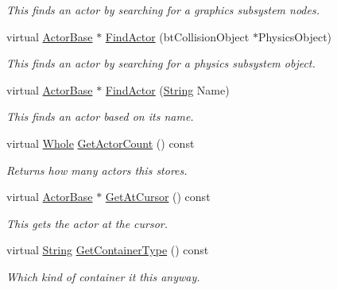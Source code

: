 \begin{DoxyCompactItemize}
\begin{DoxyCompactList}\small\item\em This finds an actor by searching for a graphics subsystem nodes. \item\end{DoxyCompactList}\item 
virtual \hyperlink{classMezzanine_1_1ActorBase}{ActorBase} $\ast$ \hyperlink{classMezzanine_1_1ActorContainerVector_acc1507a3a9d464ff0c343786986bef98}{FindActor} (btCollisionObject $\ast$PhysicsObject)
\begin{DoxyCompactList}\small\item\em This finds an actor by searching for a physics subsystem object. \item\end{DoxyCompactList}\item 
virtual \hyperlink{classMezzanine_1_1ActorBase}{ActorBase} $\ast$ \hyperlink{classMezzanine_1_1ActorContainerVector_a09837c17229c0a17031e7ce5fa3f6fc6}{FindActor} (\hyperlink{namespaceMezzanine_acf9fcc130e6ebf08e3d8491aebcf1c86}{String} Name)
\begin{DoxyCompactList}\small\item\em This finds an actor based on its name. \item\end{DoxyCompactList}\item 
virtual \hyperlink{namespaceMezzanine_adcbb6ce6d1eb4379d109e51171e2e493}{Whole} \hyperlink{classMezzanine_1_1ActorContainerVector_a9a4e61bb6597fb66906c779c1f27e051}{GetActorCount} () const 
\begin{DoxyCompactList}\small\item\em Returns how many actors this stores. \item\end{DoxyCompactList}\item 
virtual \hyperlink{classMezzanine_1_1ActorBase}{ActorBase} $\ast$ \hyperlink{classMezzanine_1_1ActorContainerVector_ac9efeefbc35033294723d33a8edd72c2}{GetAtCursor} () const 
\begin{DoxyCompactList}\small\item\em This gets the actor at the cursor. \item\end{DoxyCompactList}\item 
virtual \hyperlink{namespaceMezzanine_acf9fcc130e6ebf08e3d8491aebcf1c86}{String} \hyperlink{classMezzanine_1_1ActorContainerVector_a22c7e6456504a7a7f93825936d2d2b8f}{GetContainerType} () const 
\begin{DoxyCompactList}\small\item\em Which kind of container it this anyway. \item\end{DoxyCompactList}\item 

\end{DoxyCompactItemize}
